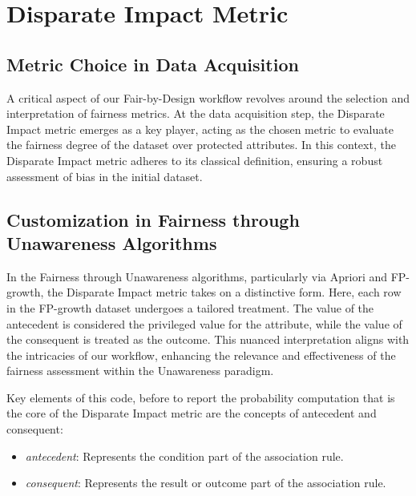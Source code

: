 \section{Disparate Impact Metric}

\subsection{Metric Choice in Data Acquisition}

A critical aspect of our Fair-by-Design workflow revolves around the selection and interpretation of fairness metrics. At the data acquisition step, the Disparate Impact metric emerges as a key player, acting as the chosen metric to evaluate the fairness degree of the dataset over protected attributes. In this context, the Disparate Impact metric adheres to its classical definition, ensuring a robust assessment of bias in the initial dataset.

\subsection{Customization in Fairness through Unawareness Algorithms}

In the Fairness through Unawareness algorithms, particularly via Apriori and FP-growth, the Disparate Impact metric takes on a distinctive form. Here, each row in the FP-growth dataset undergoes a tailored treatment. The value of the antecedent is considered the privileged value for the attribute, while the value of the consequent is treated as the outcome. This nuanced interpretation aligns with the intricacies of our workflow, enhancing the relevance and effectiveness of the fairness assessment within the Unawareness paradigm.



Key elements of this code, before to report the probability computation that is the core of the Disparate Impact metric are the concepts of antecedent and consequent:

\begin{itemize}

    \item \emph{antecedent}: Represents the condition part of the association rule.
    
    \item \emph{consequent}: Represents the result or outcome part of the association rule.

\end{itemize}

